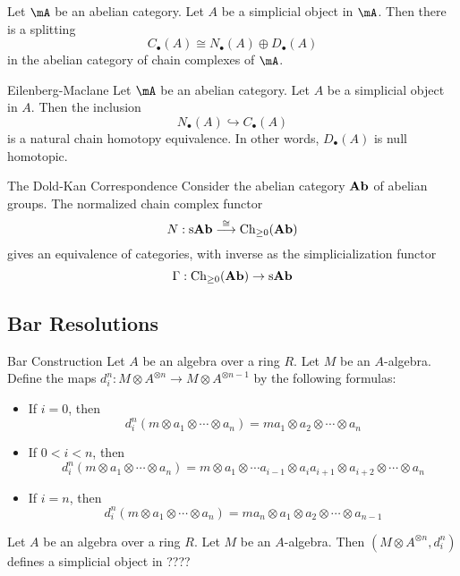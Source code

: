 \documentclass[a4paper]{article}
\begin{document}
\begin{prp}{}{} Let $\mA$ be an abelian category. Let $A$ be a simplicial object in $\mA$. Then there is a splitting $$C_\bullet(A)\cong N_\bullet(A)\oplus D_\bullet(A)$$ in the abelian category of chain complexes of $\mA$. 
\end{prp}

\begin{thm}{Eilenberg-Maclane}{} Let $\mA$ be an abelian category. Let $A$ be a simplicial object in $A$. Then the inclusion $$N_\bullet(A)\hookrightarrow C_\bullet(A)$$ is a natural chain homotopy equivalence. In other words, $D_\bullet(A)$ is null homotopic. 
\end{thm}

\begin{thm}{The Dold-Kan Correspondence}{} Consider the abelian category $\bold{Ab}$ of abelian groups. The normalized chain complex functor $$N:\text{s}\bold{Ab}\overset{\cong}{\longrightarrow}\text{Ch}_{\geq 0}(\bold{Ab})$$ gives an equivalence of categories, with inverse as the simplicialization functor $$\Gamma:\text{Ch}_{\geq 0}(\bold{Ab})\to\text{s}\bold{Ab}$$
\end{thm}


\subsection{Bar Resolutions}
\begin{defn}{Bar Construction}{} Let $A$ be an algebra over a ring $R$. Let $M$ be an $A$-algebra. Define the maps $d_i^n:M\otimes A^{\otimes n}\to M\otimes A^{\otimes n-1}$ by the following formulas: 
\begin{itemize}
\item If $i=0$, then $$d_i^n(m\otimes a_1\otimes\cdots\otimes a_n)=ma_1\otimes a_2\otimes\cdots\otimes a_n$$
\item If $0<i<n$, then $$d_i^n(m\otimes a_1\otimes\cdots\otimes a_n)=m\otimes a_1\otimes\cdots a_{i-1}\otimes a_ia_{i+1}\otimes a_{i+2}\otimes\cdots\otimes a_n$$
\item If $i=n$, then $$d_i^n(m\otimes a_1\otimes\cdots\otimes a_n)=ma_n\otimes a_1\otimes a_2\otimes\cdots\otimes a_{n-1}$$
\end{itemize}
\end{defn}

\begin{prp}{}{} Let $A$ be an algebra over a ring $R$. Let $M$ be an $A$-algebra. Then $(M\otimes A^{\otimes n},d_i^n)$ defines a simplicial object in ????
\end{prp}
\end{document}
